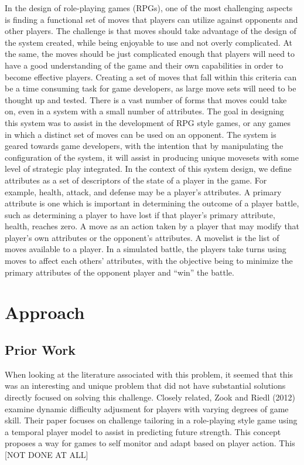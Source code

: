 \documentclass{acm_proc_article-sp}
\begin{document}
In the design of role-playing games (RPGs), one of the most challenging aspects is finding a functional set of moves that players can utilize against opponents and other players. The challenge is that moves should take advantage of the design of the system created, while being enjoyable to use and not overly complicated. At the same, the moves should be just complicated enough that players will need to have a good understanding of the game and their own capabilities in order to become effective players. Creating a set of moves that fall within this criteria can be a time consuming task for game developers, as large move sets will need to be thought up and tested. There is a vast number of forms that moves could take on, even in a system with a small number of attributes.
The goal in designing this system was to assist in the development of RPG style games, or any games in which a distinct set of moves can be used on an opponent. The system is geared towards game developers, with the intention that by manipulating the configuration of the system, it will assist in producing unique movesets with some level of strategic play integrated.
In the context of this system design, we define attributes as a set of descriptors of the state of a player in the game. For example, health, attack, and defense may be a player’s attributes. A primary attribute is one which is important in determining the outcome of a player battle, such as determining a player to have lost if that player’s primary attribute, health, reaches zero. A move as an action taken by a player that may modify that player’s own attributes or the opponent’s attributes. A movelist is the list of moves available to a player. In a simulated battle, the players take turns using moves to affect each others’ attributes, with the objective being to minimize the primary attributes of the opponent player and “win” the battle.

\section{Approach}

\subsection{Prior Work}

When looking at the literature associated with this problem, it seemed that this was an interesting and unique problem that did not have substantial solutions directly focused on solving this challenge. Closely related, Zook and Riedl (2012) examine dynamic difficulty adjusment for players with varying degrees of game skill. Their paper focuses on challenge tailoring in a role-playing style game using a temporal player model to assist in predicting future strength. This concept proposes a way for games to self monitor and adapt based on player action. This [NOT DONE AT ALL]
\end{document}
